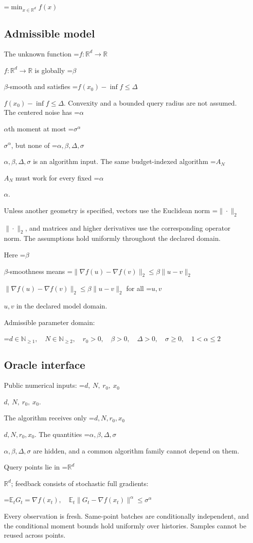\documentclass[10pt,a4paper]{article}
\newcommand{\AtlasMath}[1]{\par\begingroup\centering\setbox0=\hbox{$\displaystyle #1$}\ifdim\wd0>1.4\linewidth\typeout{ATLAS WIDE FORMULA: \the\wd0}\fi\ifdim\wd0>\linewidth\resizebox{\linewidth}{!}{\box0}\else\box0\fi\par\endgroup}
\newcommand{\AtlasInlineMath}[1]{\begingroup\setbox0=\hbox{$#1$}\ifdim\wd0>.4\linewidth\endgroup\AtlasMath{#1}\else\endgroup$#1$\fi}
\begin{document}
\AtlasMath{\min_{x\in \mathbb{R}^d}f(x)}


\subsection{Admissible model}
The unknown function \AtlasInlineMath{f:\mathbb R^d\to\mathbb R} is globally \AtlasInlineMath{\beta}-smooth and satisfies \AtlasInlineMath{f(x_0)-\inf f\le\Delta}. Convexity and a bounded query radius are not assumed. The centered noise has \AtlasInlineMath{\alpha}th moment at most \AtlasInlineMath{\sigma^\alpha}, but none of \AtlasInlineMath{\alpha,\beta,\Delta,\sigma} is an algorithm input. The same budget-indexed algorithm \AtlasInlineMath{A_N} must work for every fixed \AtlasInlineMath{\alpha}.

Unless another geometry is specified, vectors use the Euclidean norm \AtlasInlineMath{\|\cdot\|_2}, and matrices and higher derivatives use the corresponding operator norm. The assumptions hold uniformly throughout the declared domain.

Here \AtlasInlineMath{\beta}-smoothness means \AtlasInlineMath{\|\nabla f(u)-\nabla f(v)\|_2\le\beta\|u-v\|_2} for all \AtlasInlineMath{u,v} in the declared model domain.

Admissible parameter domain:


\AtlasMath{d\in\mathbb{N}_{\ge1},\quad N\in\mathbb{N}_{\ge2},\quad r_0>0,\quad\beta>0,\quad\Delta>0,\quad\sigma\ge0,\quad1<\alpha\le2}


\subsection{Oracle interface}
Public numerical inputs: \AtlasInlineMath{d,\ N,\ r_0,\ x_0}.

The algorithm receives only \AtlasInlineMath{d,N,r_0,x_0}. The quantities \AtlasInlineMath{\alpha,\beta,\Delta,\sigma} are hidden, and a common algorithm family cannot depend on them.

Query points lie in \AtlasInlineMath{\mathbb{R}^d}; feedback consists of stochastic full gradients:


\AtlasMath{\mathbb{E}_tG_t=\nabla f(x_t),\quad\mathbb{E}_t\|G_t-\nabla f(x_t)\|^\alpha\le\sigma^\alpha}


Every observation is fresh. Same-point batches are conditionally independent, and the conditional moment bounds hold uniformly over histories. Samples cannot be reused across points.
\end{document}
